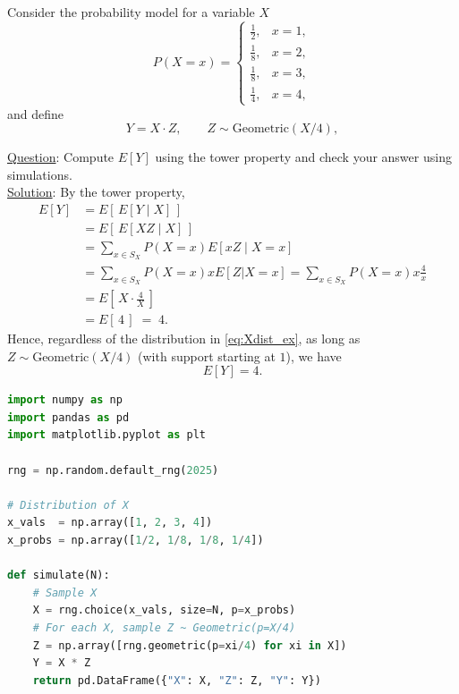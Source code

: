 \begin{example}
Consider the probability model for a variable $X$
\begin{equation}\label{eq:Xdist_ex}
P(X=x)=
\begin{cases}
\frac{1}{2}, & x=1,\\[2pt]
\frac{1}{8}, & x=2,\\[2pt]
\frac{1}{8}, & x=3,\\[2pt]
\frac{1}{4}, & x=4,
\end{cases}
\end{equation}
and define
\begin{equation}\label{eq:YZ_ex}
Y = X\cdot Z,\qquad Z \sim \mathrm{Geometric}(X/4),
\end{equation}


\noindent
\underline{Question}: Compute $E[Y]$ using the tower property and check your answer using simulations.\\

\noindent
\underline{Solution}:
By the tower property,
\begin{align}
E[Y] &= E\!\left[\,E[Y\mid X]\,\right] \label{eq:tower_start}\\
     &= E\!\left[\,E[XZ\mid X]\,\right]  \\
     &=\sum_{x \in S_X} P(X=x) E[xZ\mid X=x] \label{eq:pull_out}\\
     &=\sum_{x \in S_X} P(X=x)x E[Z| X=x] = \sum_{x \in S_X} P(X=x)x\frac{4}{x}\\
     &= E\!\left[\,X \cdot \frac{4}{X}\,\right] \label{eq:geom_mean}\\
     &= E[\,4\,] \;=\; 4. \label{eq:finalEY}
\end{align}
Hence, regardless of the distribution in \eqref{eq:Xdist_ex}, as long as $Z\sim\mathrm{Geometric}(X/4)$ (with support starting at $1$), we have
\begin{equation}\label{eq:EY_value}
E[Y]=4.
\end{equation}

\begin{lstlisting}[language=Python]
import numpy as np
import pandas as pd
import matplotlib.pyplot as plt

rng = np.random.default_rng(2025)

# Distribution of X
x_vals  = np.array([1, 2, 3, 4])
x_probs = np.array([1/2, 1/8, 1/8, 1/4])

def simulate(N):
    # Sample X
    X = rng.choice(x_vals, size=N, p=x_probs)
    # For each X, sample Z ~ Geometric(p=X/4)
    Z = np.array([rng.geometric(p=xi/4) for xi in X])
    Y = X * Z
    return pd.DataFrame({"X": X, "Z": Z, "Y": Y})


\end{lstlisting}
\end{example}
